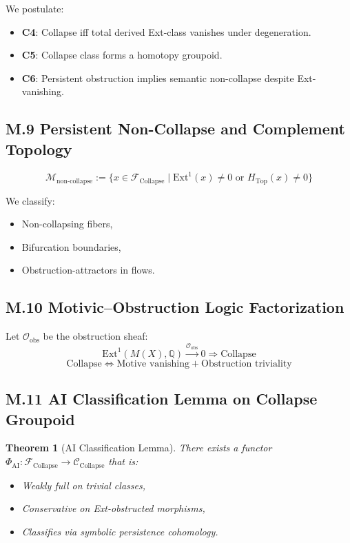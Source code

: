 \documentclass[11pt]{article}
\newtheorem{theorem}{Theorem}[section]
\begin{document}
\begin{axiom}
\begin{axiom}
{{We postulate:
\begin{itemize}
  \item \textbf{C4}: Collapse iff total derived Ext-class vanishes under degeneration.
  \item \textbf{C5}: Collapse class forms a homotopy groupoid.
  \item \textbf{C6}: Persistent obstruction implies semantic non-collapse despite Ext-vanishing.
\end{itemize}

\subsection*{M.9 Persistent Non-Collapse and Complement Topology}

\[
\mathcal{M}_{\text{non-collapse}} := \{ x \in \mathcal{F}_{\text{Collapse}} \mid \mathrm{Ext}^1(x) \neq 0 \text{ or } H_{\text{Top}}(x) \neq 0 \}
\]

We classify:
\begin{itemize}
  \item Non-collapsing fibers,
  \item Bifurcation boundaries,
  \item Obstruction-attractors in flows.
\end{itemize}

\subsection*{M.10 Motivic–Obstruction Logic Factorization}

Let $\mathcal{O}_{\text{obs}}$ be the obstruction sheaf:
\[
\mathrm{Ext}^1(M(X),\mathbb{Q}) \overset{\mathcal{O}_{\text{obs}}}{\longrightarrow} 0 \Rightarrow \text{Collapse}
\]
\[
\text{Collapse} \Longleftrightarrow \text{Motive vanishing} + \text{Obstruction triviality}
\]

\subsection*{M.11 AI Classification Lemma on Collapse Groupoid}

\begin{theorem}[AI Classification Lemma]
There exists a functor $\Phi_{\text{AI}}: \mathcal{F}_{\text{Collapse}} \to \mathcal{C}_{\text{Collapse}}$  
that is:
\begin{itemize}
  \item Weakly full on trivial classes,
  \item Conservative on Ext-obstructed morphisms,
  \item Classifies via symbolic persistence cohomology.
\end{itemize}
\end{theorem}

}}
\end{axiom}
\end{axiom}
\end{document}
